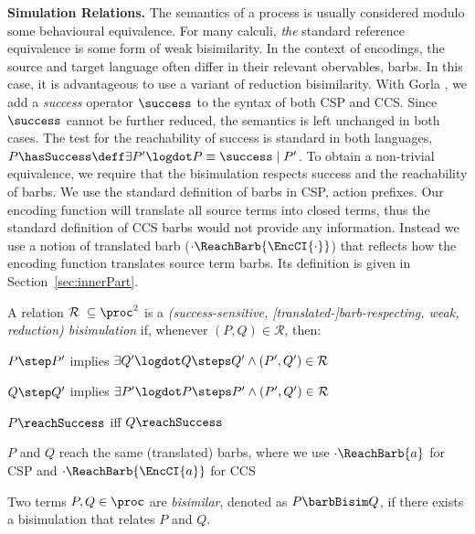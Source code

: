 \documentclass[copyright,creativecommons]{eptcs}
\begin{document}
\vspace{0.5em}
\noindent
\textbf{Simulation Relations.}\;
The semantics of a process is usually considered modulo some behavioural equivalence.
For many calculi, \emph{the} standard reference equivalence is some form of weak bisimilarity.
In the context of encodings, the source and target language often differ in their relevant obervables, \ie barbs. In this case, it is advantageous to use a variant of reduction bisimilarity.
With Gorla \cite{gorla10}, we add a \emph{success} operator $ \success $ to the syntax of both CSP and CCS. Since $ \success $ cannot be further reduced, the semantics is left unchanged in both cases. The test for the reachability of success is standard in both languages, \ie $ P\hasSuccess \deff \exists P'\logdot P \equiv \success \mid P' $.
To obtain a non-trivial equivalence, we require that the bisimulation respects success and the reachability of barbs.
We use the standard definition of barbs in CSP, \ie action prefixes.
Our encoding function will translate all source terms into closed terms, thus the standard definition of CCS barbs would not provide any information.
Instead we use a notion of translated barb ($ \cdot\ReachBarb{\EncCI{\cdot}} $) that reflects how the encoding function translates source term barbs. Its definition is given in Section~\ref{sec:innerPart}.

\begin{definition}[Bisimulation]
	A relation $ \mathcal{R} \; \subseteq \proc^2 $ is a \emph{(success-sensitive, [translated-]barb-respecting, weak, reduction) bisimulation} if, whenever $ \left( P, Q \right) \in \mathcal{R} $, then:
	\begin{compactitem}
		\item $ P \step P' $ implies $ \exists Q'\logdot Q \steps Q' \wedge \left( P', Q' \right) \in \mathcal{R} $
		\item $ Q \step Q' $ implies $ \exists P'\logdot P \steps P' \wedge \left( P', Q' \right) \in \mathcal{R} $
		\item $ P\reachSuccess $ iff $ Q\reachSuccess $
		\item $ P $ and $ Q $ reach the same (translated) barbs, where we use $ \cdot\ReachBarb{a} $ for CSP and $ \cdot\ReachBarb{\EncCI{a}} $ for CCS
	\end{compactitem}
	Two terms $ P, Q \in \proc $ are \emph{bisimilar}, denoted as $ P \barbBisim Q $, if there exists a bisimulation that relates $ P $ and $ Q $.
\end{definition}
\end{document}
